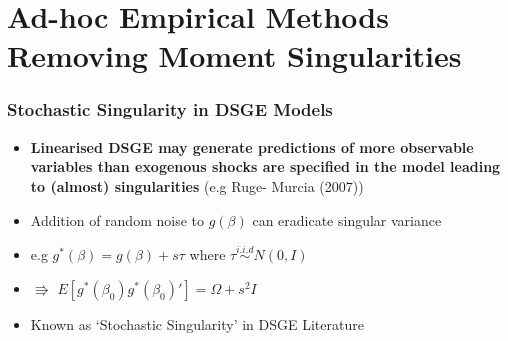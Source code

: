 \documentclass{beamer}
\begin{document}
    \section{ Ad-hoc Empirical Methods Removing Moment Singularities}
  \begin{frame}
  \frametitle{Stochastic Singularity in DSGE Models}
  \begin{itemize}


  \item[]\textbf{Linearised DSGE may generate predictions of more observable variables than exogenous shocks are specified in
the model leading to (almost) singularities }(e.g Ruge- Murcia (2007))
  \vspace{10pt}
\item[] Addition of random noise to  $g(\beta)$ can eradicate singular variance
   \vspace{10pt}

  \item[] e.g $g^*(\beta)=g(\beta)+s\tau$ where $\tau\overset{i.i.d}{\sim} N(0,I)$
   \vspace{10pt}
  \item[] $\Rrightarrow $ $E[g^*(\beta_0)g^*(\beta_0)']=\Omega+s^2I$
  \vspace{10pt}
  \item[] Known as `Stochastic Singularity' in DSGE Literature


  \end{itemize}
  \end{frame}
\end{document}

